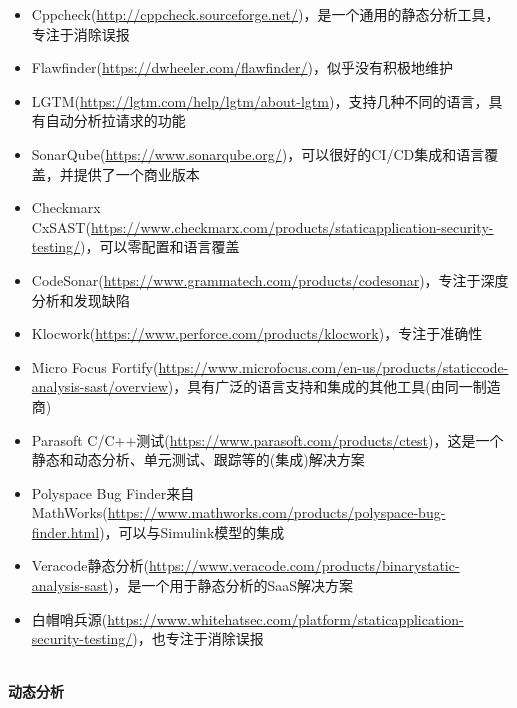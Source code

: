 \begin{itemize}
\item 
Cppcheck(\url{http://cppcheck.sourceforge.net/})，是一个通用的静态分析工具，专注于消除误报

\item 
Flawfinder(\url{https://dwheeler.com/flawfinder/})，似乎没有积极地维护

\item 
LGTM(\url{https://lgtm.com/help/lgtm/about-lgtm})，支持几种不同的语言，具有自动分析拉请求的功能

\item 
SonarQube(\url{https://www.sonarqube.org/})，可以很好的CI/CD集成和语言覆盖，并提供了一个商业版本

\item 
Checkmarx CxSAST(\url{https://www.checkmarx.com/products/staticapplication-security-testing/})，可以零配置和语言覆盖

\item 
CodeSonar(\url{https://www.grammatech.com/products/codesonar})，专注于深度分析和发现缺陷

\item 
Klocwork(\url{https://www.perforce.com/products/klocwork})，专注于准确性

\item 
Micro Focus Fortify(\url{https://www.microfocus.com/en-us/products/staticcode-analysis-sast/overview})，具有广泛的语言支持和集成的其他工具(由同一制造商)

\item 
Parasoft C/C++测试(\url{https://www.parasoft.com/products/ctest})，这是一个静态和动态分析、单元测试、跟踪等的(集成)解决方案

\item 
Polyspace Bug Finder来自MathWorks(\url{https://www.mathworks.com/products/polyspace-bug-finder.html})，可以与Simulink模型的集成

\item 
Veracode静态分析(\url{https://www.veracode.com/products/binarystatic-analysis-sast})，是一个用于静态分析的SaaS解决方案

\item 
白帽哨兵源(\url{https://www.whitehatsec.com/platform/staticapplication-security-testing/})，也专注于消除误报
\end{itemize}

\hspace*{\fill} \\ %
\noindent
\textbf{动态分析}

